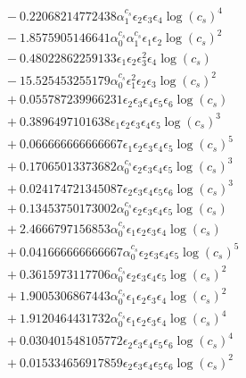 \documentclass[10pt]{article}
\begin{document}
\begin{align*}
&{}  - 0.22068214772438 \alpha_{1}^{c_s} \epsilon_{2} \epsilon_{3} \epsilon_{4} \log{\left(c_{s} \right)}^{4} \\
&{}  - 1.8575905146641 \alpha_{0}^{c_s} \alpha_{1}^{c_s} \epsilon_{1} \epsilon_{2} \log{\left(c_{s} \right)}^{2} \\
&{}  - 0.48022862259133 \epsilon_{1} \epsilon_{2} \epsilon_{3}^{2} \epsilon_{4} \log{\left(c_{s} \right)} \\
&{}  - 15.525453255179 \alpha_{0}^{c_s} \epsilon_{1}^{2} \epsilon_{2} \epsilon_{3} \log{\left(c_{s} \right)}^{2} \\
&{}  + 0.055787239966231 \epsilon_{2} \epsilon_{3} \epsilon_{4} \epsilon_{5} \epsilon_{6} \log{\left(c_{s} \right)} \\
&{}  + 0.3896497101638 \epsilon_{1} \epsilon_{2} \epsilon_{3} \epsilon_{4} \epsilon_{5} \log{\left(c_{s} \right)}^{3} \\
&{}  + 0.066666666666667 \epsilon_{1} \epsilon_{2} \epsilon_{3} \epsilon_{4} \epsilon_{5} \log{\left(c_{s} \right)}^{5} \\
&{}  + 0.17065013373682 \alpha_{0}^{c_s} \epsilon_{2} \epsilon_{3} \epsilon_{4} \epsilon_{5} \log{\left(c_{s} \right)}^{3} \\
&{}  + 0.024174721345087 \epsilon_{2} \epsilon_{3} \epsilon_{4} \epsilon_{5} \epsilon_{6} \log{\left(c_{s} \right)}^{3} \\
&{}  + 0.13453750173002 \alpha_{0}^{c_s} \epsilon_{2} \epsilon_{3} \epsilon_{4} \epsilon_{5} \log{\left(c_{s} \right)} \\
&{}  + 2.4666797156853 \alpha_{0}^{c_s} \epsilon_{1} \epsilon_{2} \epsilon_{3} \epsilon_{4} \log{\left(c_{s} \right)} \\
&{}  + 0.041666666666667 \alpha_{0}^{c_s} \epsilon_{2} \epsilon_{3} \epsilon_{4} \epsilon_{5} \log{\left(c_{s} \right)}^{5} \\
&{}  + 0.3615973117706 \alpha_{0}^{c_s} \epsilon_{2} \epsilon_{3} \epsilon_{4} \epsilon_{5} \log{\left(c_{s} \right)}^{2} \\
&{}  + 1.9005306867443 \alpha_{0}^{c_s} \epsilon_{1} \epsilon_{2} \epsilon_{3} \epsilon_{4} \log{\left(c_{s} \right)}^{2} \\
&{}  + 1.9120464431732 \alpha_{0}^{c_s} \epsilon_{1} \epsilon_{2} \epsilon_{3} \epsilon_{4} \log{\left(c_{s} \right)}^{4} \\
&{}  + 0.030401548105772 \epsilon_{2} \epsilon_{3} \epsilon_{4} \epsilon_{5} \epsilon_{6} \log{\left(c_{s} \right)}^{4} \\
&{}  + 0.015334656917859 \epsilon_{2} \epsilon_{3} \epsilon_{4} \epsilon_{5} \epsilon_{6} \log{\left(c_{s} \right)}^{2} \\

\end{align*}
\end{document}
